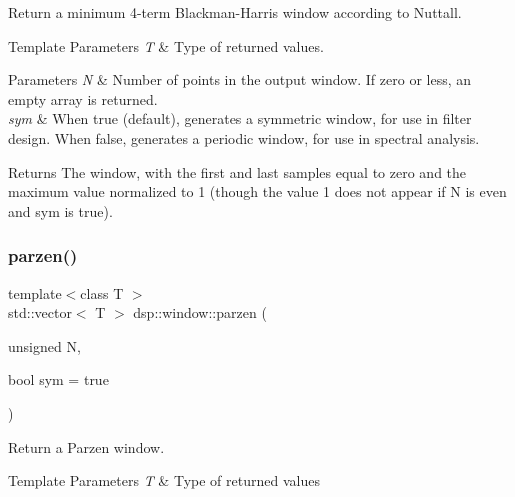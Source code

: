 Return a minimum 4-\/term Blackman-\/\+Harris window according to Nuttall. 


\begin{DoxyTemplParams}{Template Parameters}
{\em T} & Type of returned values. \\
\hline
\end{DoxyTemplParams}

\begin{DoxyParams}{Parameters}
{\em N} & Number of points in the output window. If zero or less, an empty array is returned. \\
\hline
{\em sym} & When true (default), generates a symmetric window, for use in filter design. When false, generates a periodic window, for use in spectral analysis. \\
\hline
\end{DoxyParams}
\begin{DoxyReturn}{Returns}
The window, with the first and last samples equal to zero and the maximum value normalized to 1 (though the value 1 does not appear if N is even and sym is true). 
\end{DoxyReturn}
\mbox{\label{namespacedsp_1_1window_a479dc86ffddf5e19d595c0c0e751edda}} 
\subsubsection{\texorpdfstring{parzen()}{parzen()}}
{\footnotesize\ttfamily template$<$class T $>$ \\
std\+::vector$<$ T $>$ dsp\+::window\+::parzen (\begin{DoxyParamCaption}\item[{unsigned}]{N,  }\item[{bool}]{sym = {\ttfamily true} }\end{DoxyParamCaption})}



Return a Parzen window. 


\begin{DoxyTemplParams}{Template Parameters}
{\em T} & Type of returned values \\
\hline
\end{DoxyTemplParams}

